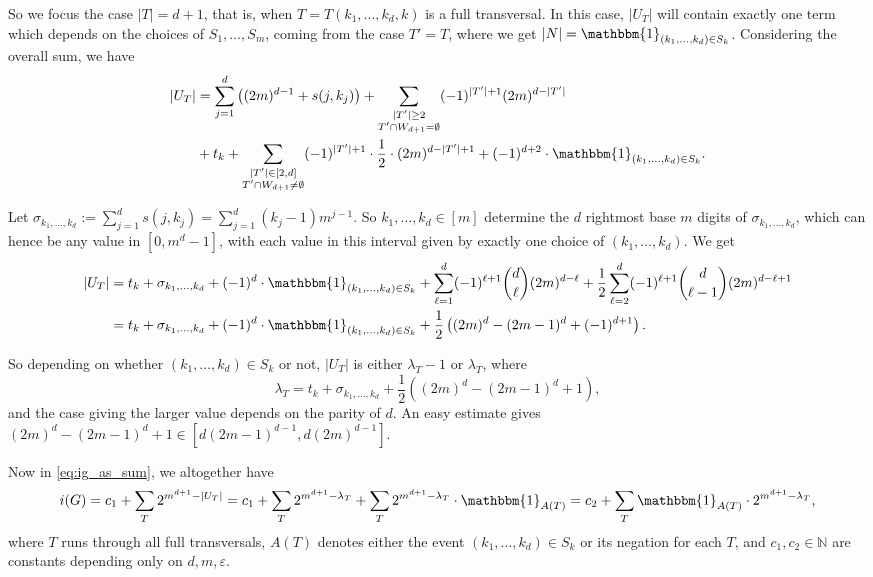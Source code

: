 \documentclass[10pt,a4paper]{article}
\numberwithin{equation}{section}
\newcommand{\nn}{\mathbb{N}}
\newcommand{\eps}{\varepsilon}
\begin{document}
So we focus the case $|T|=d+1$, that is, when $T=T(k_1,\ldots,k_d,k)$ is a full transversal. In this case, $|U_T|$ will contain exactly one term which depends on the choices of $S_1,\ldots,S_m$, coming from the case $T'=T$, where we get $|N|=\mathbbm{1}_{(k_1, \ldots, k_d)\in S_k}$. Considering the overall sum, we have
\begin{equation*}
\begin{split}
|U_T| &= \sum_{j=1}^d \left((2m)^{d-1}+s(j,k_j)\right) + \sum_{\substack{|T'|\ge 2 \\ T'\cap W_{d+1}=\emptyset}} (-1)^{|T'|+1} (2m)^{d-|T'|}\\
&+ t_k + \sum_{\substack{|T'|\in [2,d]\\ T'\cap W_{d+1}\ne \emptyset}} (-1)^{|T'|+1}\cdot \frac12\cdot(2m)^{d-|T'|+1} + (-1)^{d+2}\cdot \mathbbm{1}_{(k_1, \ldots, k_d)\in S_k}.
\end{split}
\end{equation*}

Let $\sigma_{k_1,\ldots,k_d}:=\sum_{j=1}^d s(j,k_j)=\sum_{j=1}^d (k_j-1) m^{j-1}$. So $k_1,\ldots,k_d\in [m]$ determine the $d$ rightmost base $m$ digits of $\sigma_{k_1,\ldots,k_d}$, which can hence be any value in $[0, m^d-1]$, with each value in this interval given by exactly one choice of $(k_1, \ldots, k_d)$. We get
\begin{equation*}
\begin{split}
|U_T| &= t_k + \sigma_{k_1, \ldots, k_d} + (-1)^d\cdot \mathbbm{1}_{(k_1, \ldots, k_d)\in S_k} + \sum_{\ell=1}^d (-1)^{\ell+1}\binom{d}{\ell}(2m)^{d-\ell} + \frac12\sum_{\ell=2}^d (-1)^{\ell+1} \binom{d}{\ell-1}(2m)^{d-\ell+1}\\
&= t_k + \sigma_{k_1,\ldots,k_d} + (-1)^d\cdot \mathbbm{1}_{(k_1, \ldots, k_d)\in S_k} + \frac12\left((2m)^d-(2m-1)^d+(-1)^{d+1}\right).
\end{split}
\end{equation*}

So depending on whether $(k_1, \ldots, k_d)\in S_k$ or not, $|U_T|$ is either $\lambda_T-1$ or $\lambda_T$, where \begin{equation}\label{eq:lambdat}
\lambda_T=t_k+\sigma_{k_1,\ldots,k_d}+\frac12\left((2m)^d-(2m-1)^d+1\right),
\end{equation}
and the case giving the larger value depends on the parity of $d$. An easy estimate gives $(2m)^d-(2m-1)^d+1\in \left[d(2m-1)^{d-1}, d(2m)^{d-1}\right]$.

Now in \eqref{eq:ig_as_sum}, we altogether have
$$i(G)=c_1+\sum_T 2^{m^{d+1}-|U_T|}=c_1+\sum_T 2^{m^{d+1}-\lambda_T} + \sum_T 2^{m^{d+1}-\lambda_T}\cdot \mathbbm{1}_{A(T)} = c_2 + \sum_T \mathbbm{1}_{A(T)}\cdot 2^{m^{d+1}-\lambda_T},$$
where $T$ runs through all full transversals, $A(T)$ denotes either the event $(k_1, \ldots, k_d)\in S_k$ or its negation for each $T$, and $c_1,c_2\in \nn$ are constants depending only on $d,m,\eps$. 
\end{document}
